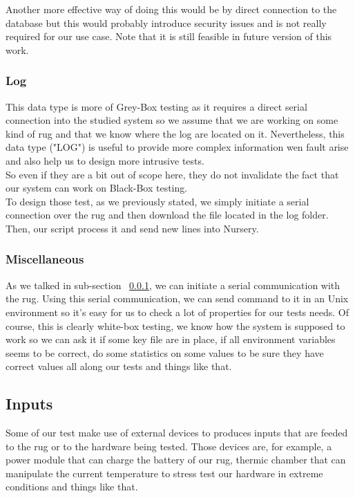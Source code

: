 \documentclass[12pt]{article}
\theoremstyle{definition}
\theoremstyle{definition}
\begin{document}
Another more effective way of doing this would be by direct connection to the database but this would probably introduce security issues and is not really required for our use case. Note that it is still feasible in future version of this work.

\subsubsection{Log}
\label{subsec:log}

This data type is more of Grey-Box testing as it requires a direct serial connection into the studied system so we assume that we  are working on some kind of \gls{rug} and that we know where the log are located on it. Nevertheless, this data type ("LOG") is useful to provide more complex information wen fault arise and also help us to design more intrusive tests.\\

So even if they are a bit out of scope here, they do not invalidate the fact that our system can work on Black-Box testing.\\

To design those test, as we previously stated, we simply initiate a serial connection over the \gls{rug} and then download the file located in the log folder. Then, our script process it and send new lines into Nursery.

\subsubsection{Miscellaneous}
\label{subsec:misc}

As we talked in sub-section ~\ref{subsec:log}, we can initiate a serial communication with the \gls{rug}. Using this serial communication, we can send command to it in an Unix environment so it's easy for us to check a lot of properties for our tests needs. Of course, this is clearly white-box testing, we know how the system is supposed to work so we can ask it if some key file are in place, if all environment variables seems to be correct, do some statistics on some values to be sure they have correct values all along our tests and things like that.\\

\subsection{Inputs}

Some of our test make use of external devices to produces inputs that are feeded to the \gls{rug} or to the hardware being tested. Those devices are, for example, a power module that can charge the battery of our \gls{rug}, thermic chamber that can manipulate the current temperature to stress test our hardware in extreme conditions and things like that.\\
\end{document}
